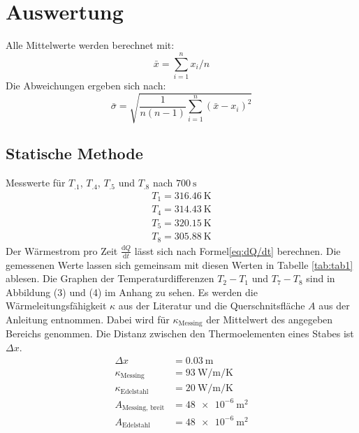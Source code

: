 \section{Auswertung}
\label{sec:Auswertung}

Alle Mittelwerte werden berechnet mit:
\begin{equation}
\bar{x} = \sum_{i=1}^{n}x_i/n \label{eq:quer}
\end{equation}
Die Abweichungen ergeben sich nach:
\begin{equation}
\bar{\sigma} = \sqrt{\frac{1}{n(n-1)}\sum_{i=1}^{n}(\bar{x}-x_i)^2}  \label{eq:sigma}
\end{equation}

\subsection{Statische Methode}

Messwerte für $T_.1$, $T_.4$, $T_.5$ und $T_.8$ nach $\SI{700}{\second}$
\begin{align*}
T_\text{1}=\SI{316.46}{\kelvin}\\
T_\text{4}=\SI{314.43}{\kelvin}\\
T_\text{5}=\SI{320.15}{\kelvin}\\
T_\text{8}=\SI{305.88}{\kelvin}
\end{align*}
Der Wärmestrom pro Zeit $\frac{\mathrm{d}Q}{\mathrm{d}t}$
lässt sich nach Formel\eqref{eq:dQ/dt} berechnen. Die gemessenen Werte lassen sich gemeinsam mit diesen Werten in Tabelle \ref{tab:tab1} ablesen. Die Graphen der Temperaturdifferenzen $T_\text{2}-T_\text{1}$ und $T_\text{7}-T_\text{8}$ sind in Abbildung (3) und (4) im Anhang zu sehen.
Es werden die Wärmeleitungsfähigkeit $\kappa$ aus der Literatur\cite{kappa} und die Querschnitsfläche $A$ aus der Anleitung\cite{V204} entnommen. Dabei wird für $\kappa_\text{Messing}$ der Mittelwert des angegeben Bereichs genommen.
Die Distanz zwischen den Thermoelementen eines Stabes ist $\Delta x$.
\begin{align*}
\Delta x 			&= \SI{0.03}{\metre}\\
\kappa_\text{Messing}	&= \SI{93}{\watt\per\metre\per\kelvin}\\
\kappa_\text{Edelstahl}	&= \SI{20}{\watt\per\metre\per\kelvin}\\
A_\text{Messing, breit} 	&= \SI{ 48e-6}{\metre\squared} \\
A_\text{Edelstahl} 		&= \SI{ 48e-6}{\metre\squared}
\end{align*}

